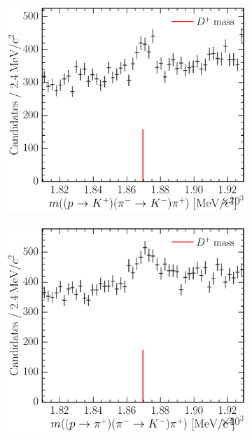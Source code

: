 \begin{figure}
  \begin{subfigure}[b]{0.3\textwidth}
    \includegraphics[width=\textwidth]{figures/cpv/selection/background_study/ppipi/LcToppipi_2012_MagDown_Dp_ppTokp_pimTokm_pip}
    \caption{\decay{\PDplus}{\PKplus\PKminus\Ppiplus}}
    \label{fig:cpv:selection:background_study:ppipi_meson:kkpi}
  \end{subfigure}
  \begin{subfigure}[b]{0.3\textwidth}
    \includegraphics[width=\textwidth]{figures/cpv/selection/background_study/ppipi/LcToppipi_2012_MagDown_Dp_ppTopip_pimTokm_pip}

\end{subfigure}
\end{figure}

